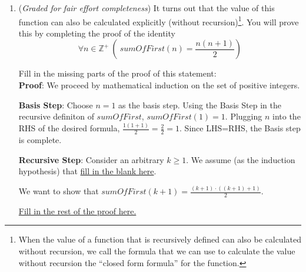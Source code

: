\documentclass[12pt, oneside]{article}
\begin{document}
\begin{enumerate}
\begin{enumerate}
        Give a recursive definition of this function, including domain, codomain and both the basis step
        and recursive step of the rule. That is, fill in the blanks 
        \[
            sumOfFirst: \underline{~~domain~~} \to \underline{~~codomain}
        \]
        given by 
        \begin{align*}
            &\textbf{Basis step}: \underline{\text{fill in basis step}} \\
            &\textbf{Recursive step}: \underline{\text{fill in recursive step}}
        \end{align*}

        {\it Notation}: Using summation, this function can be written $sumOfFirst(n) = \sum_{i=1}^n i$.\\


        \item ({\it Graded for fair effort completeness}) It turns out that the value of this function
        can also be calculated explicitly (without recursion)\footnote{When the value of a function 
        that is recursively defined can also be calculated without recursion, we call the formula 
        that we can use to calculate the value without recursion the ``closed form formula'' for the 
        function.}. You will 
        prove this by completing the proof of the identity
        \[
            \forall n \in \mathbb{Z}^+ ~\left(~sumOfFirst(n) = \frac{n(n+1)}{2} \right)
        \]
        
        Fill in the missing parts of the proof of this statement:\\

        {\bf Proof}: We proceed by mathematical induction on the set of positive integers.

        {\bf Basis Step}: Choose $n = 1$ as the basis step. 
        Using the Basis Step in the recursive definiton of $sumOfFirst$, 
        $sumOfFirst(1) = 1$. Plugging $n$ into the RHS of the desired formula,
        $\frac{1 (1+1)}{2} = \frac{2}{2} = 1$. Since LHS=RHS, the Basis step is complete.
   
        {\bf Recursive Step}: Consider an arbitrary $k \geq 1$.  
        We assume (as the induction hypothesis) that \underline{fill in the blank here}. 
   
        We want to show that $sumOfFirst(k+1) = \frac{(k + 1) \cdot ((k + 1) + 1)}{2}$.
   
        \underline{Fill in the rest of the proof here.} \\


\end{enumerate}
\end{enumerate}
\end{document}
